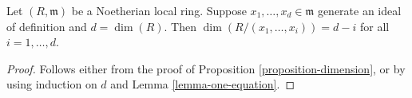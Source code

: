 \begin{lemma}
\label{lemma-elements-generate-ideal-definition}
Let $(R, \mathfrak m)$ be a Noetherian local ring.
Suppose $x_1, \ldots, x_d \in \mathfrak m$ generate an
ideal of definition and $d = \dim(R)$. Then
$\dim(R/(x_1, \ldots, x_i)) = d - i$ for all $i = 1, \ldots, d$.
\end{lemma}

\begin{proof}
Follows either from the proof of Proposition \ref{proposition-dimension},
or by using induction on $d$ and Lemma \ref{lemma-one-equation}.
\end{proof}







